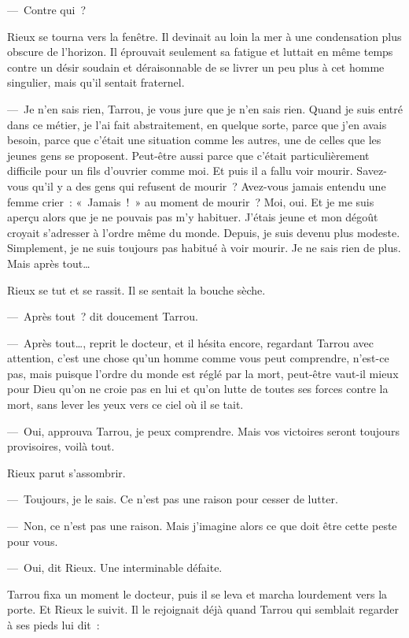 \documentclass[french,twoside]{book} %
\begin{document}
— Contre qui ?\par
Rieux se tourna vers la fenêtre. Il devinait au loin la mer à une condensation plus obscure de l’horizon. Il éprouvait seulement sa fatigue et luttait en même temps contre un désir soudain et déraisonnable de se livrer un peu plus à cet homme singulier, mais qu’il sentait fraternel.\par
— Je n’en sais rien, Tarrou, je vous jure que je n’en sais rien. Quand je suis entré dans ce métier, je l’ai fait abstraitement, en quelque sorte, parce que j’en avais besoin, parce que c’était une situation comme les autres, une de celles que les jeunes gens se proposent. Peut-être aussi parce que c’était particulièrement difficile pour un fils d’ouvrier comme moi. Et puis il a fallu voir mourir. Savez-vous qu’il y a des gens qui refusent de mourir ? Avez-vous jamais entendu une femme crier : « Jamais ! » au moment de mourir ? Moi, oui. Et je me suis aperçu alors que je ne pouvais pas m’y habituer. J’étais jeune et mon dégoût croyait s’adresser à l’ordre même du monde. Depuis, je suis devenu plus modeste. Simplement, je ne suis toujours pas habitué à voir mourir. Je ne sais rien de plus. Mais après tout…\par
Rieux se tut et se rassit. Il se sentait la bouche sèche.\par
— Après tout ? dit doucement Tarrou.\par
— Après tout…, reprit le docteur, et il hésita encore, regardant Tarrou avec attention, c’est une chose qu’un homme comme vous peut comprendre, n’est-ce pas, mais puisque l’ordre du monde est réglé par la mort, peut-être vaut-il mieux pour Dieu qu’on ne croie pas en lui et qu’on lutte de toutes ses forces contre la mort, sans lever les yeux vers ce ciel où il se tait.\par
— Oui, approuva Tarrou, je peux comprendre. Mais vos victoires seront toujours provisoires, voilà tout.\par
Rieux parut s’assombrir.\par
— Toujours, je le sais. Ce n’est pas une raison pour cesser de lutter.\par
— Non, ce n’est pas une raison. Mais j’imagine alors ce que doit être cette peste pour vous.\par
— Oui, dit Rieux. Une interminable défaite.\par
Tarrou fixa un moment le docteur, puis il se leva et marcha lourdement vers la porte. Et Rieux le suivit. Il le rejoignait déjà quand Tarrou qui semblait regarder à ses pieds lui dit :\par
\end{document}
